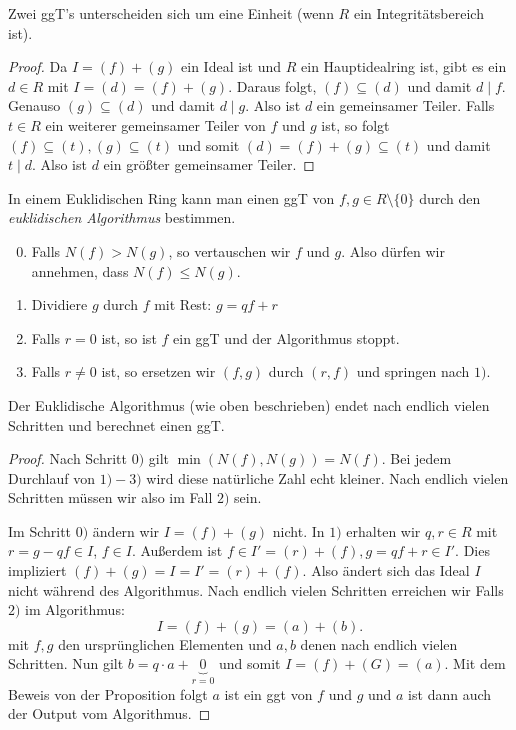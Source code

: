 \begin{remark}
	Zwei ggT's unterscheiden sich um eine Einheit (wenn $R$ ein Integritätsbereich ist).
\end{remark}

\begin{proof}
	Da $I = (f) + (g)$ ein Ideal ist und $R$ ein Hauptidealring ist, gibt es ein $d \in R$ mit $I = (d) = (f) + (g)$.
	Daraus folgt, $(f) \subseteq (d)$ und damit $d \mid f$. Genauso $(g) \subseteq (d)$ und damit $d \mid g$.
	Also ist $d$ ein gemeinsamer Teiler.
	Falls $t \in R$ ein weiterer gemeinsamer Teiler von $f$ und $g$ ist, so folgt $(f) \subseteq (t), (g) \subseteq (t)$ und somit
	$(d) = (f) + (g) \subseteq (t)$ und damit $t \mid d$.
	Also ist $d$ ein größter gemeinsamer Teiler.
\end{proof}

In einem Euklidischen Ring kann man einen ggT von $f,g \in R \setminus \{0\} $ durch den \emph{euklidischen Algorithmus} bestimmen.
\begin{enumerate}[1)]
	\setcounter{enumi}{-1}
	\item Falls $N(f) > N(g)$, so vertauschen wir $f$ und $g$. 
		Also dürfen wir annehmen, dass $N(f) \leq N(g)$.
	\item Dividiere $g$ durch $f$ mit Rest: $g = q f + r$
	\item Falls $r = 0$ ist, so ist $f$ ein ggT und der Algorithmus stoppt.
	\item Falls $r\neq 0$ ist, so ersetzen wir $(f,g)$ durch $(r,f)$ und springen nach $1)$.
\end{enumerate}

\begin{lemma}
	Der Euklidische Algorithmus (wie oben beschrieben) endet nach endlich vielen Schritten und berechnet einen ggT.
\end{lemma}

\begin{proof}
	Nach Schritt $0)$ gilt $\min(N(f), N(g)) = N(f)$. 
	Bei jedem Durchlauf von $1)-3)$ wird diese natürliche Zahl echt kleiner.
	Nach endlich vielen Schritten müssen wir also im Fall $2)$ sein.

	Im Schritt $0)$ ändern wir $I = (f) + (g)$ nicht.
	In $1)$ erhalten wir $q,r \in R$ mit $r = g- qf \in I$, $f \in I$.
	Außerdem ist $f \in I' = (r) + (f), g = qf + r \in I'$.
	Dies impliziert $(f) + (g) = I = I' = (r)+(f)$.
	Also ändert sich das Ideal $I$ nicht während des Algorithmus.
	Nach endlich vielen Schritten erreichen wir Falls $2)$ im Algorithmus:
	\[
		I = (f) + (g) = (a) + (b)
	.\] 
	mit $f,g$ den ursprünglichen Elementen und $a,b$ denen nach endlich vielen Schritten.
	Nun gilt $b = q \cdot a + \underbrace{0}_{r=0}$ und somit $I = (f) + (G) = (a)$.
	Mit dem Beweis von der Proposition folgt $a$ ist ein ggt von $f$ und $g$ und $a$ ist dann auch der Output vom Algorithmus.
\end{proof}

